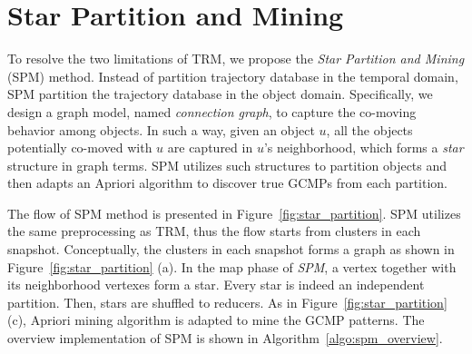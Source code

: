 \section{Star Partition and Mining}
\label{sec:spm}
To resolve the two limitations of TRM, we 
propose the \emph{Star Partition and Mining} (SPM) method.
Instead of partition trajectory database in the temporal domain,
SPM partition the trajectory database in the object domain.
Specifically, we design a graph model, named \emph{connection graph}, to capture 
the co-moving behavior among objects. In such a way, 
given an object $u$, all the objects potentially
co-moved with $u$ are captured in $u$'s neighborhood, which
forms a \emph{star} structure in graph terms. SPM utilizes
such structures to partition objects and then adapts an Apriori 
algorithm to discover true GCMPs from each partition.

The flow of SPM method is presented in Figure~\ref{fig:star_partition}.
SPM utilizes the same preprocessing as TRM, thus the flow starts
from clusters in each snapshot. Conceptually, the clusters 
in each snapshot forms a graph as shown in Figure~\ref{fig:star_partition} (a).
In the map phase of \emph{SPM}, a vertex together with its neighborhood 
vertexes form a star. Every star is indeed an independent partition.
Then, stars are shuffled to reducers. As in
Figure~\ref{fig:star_partition} (c), Apriori mining algorithm is adapted
to mine the GCMP patterns. The overview implementation of SPM is shown 
in Algorithm~\ref{algo:spm_overview}.


